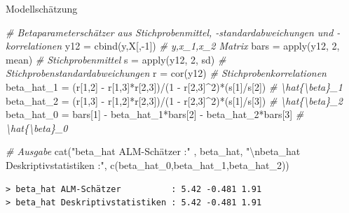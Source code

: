 \documentclass[
  8pt,
  ignorenonframetext,
]{beamer}
\newenvironment{Shaded}{\begin{snugshade}}{\end{snugshade}}
\newcommand{\CommentTok}[1]{\textcolor[rgb]{0.56,0.35,0.01}{\textit{#1}}}
\newcommand{\DecValTok}[1]{\textcolor[rgb]{0.00,0.00,0.81}{#1}}
\newcommand{\FunctionTok}[1]{\textcolor[rgb]{0.00,0.00,0.00}{#1}}
\newcommand{\NormalTok}[1]{#1}
\newcommand{\OtherTok}[1]{\textcolor[rgb]{0.56,0.35,0.01}{#1}}
\newcommand{\SpecialCharTok}[1]{\textcolor[rgb]{0.00,0.00,0.00}{#1}}
\newcommand{\StringTok}[1]{\textcolor[rgb]{0.31,0.60,0.02}{#1}}
\begin{document}
\begin{frame}[fragile]{Modellschätzung}
\begin{Shaded}
\begin{Highlighting}[]
\CommentTok{\# Betaparameterschätzer aus Stichprobenmittel, {-}standardabweichungen und {-}korrelationen}
\NormalTok{y12        }\OtherTok{=} \FunctionTok{cbind}\NormalTok{(y,X[,}\SpecialCharTok{{-}}\DecValTok{1}\NormalTok{])                                     }\CommentTok{\# y,x\_1,x\_2 Matrix}
\NormalTok{bars       }\OtherTok{=} \FunctionTok{apply}\NormalTok{(y12, }\DecValTok{2}\NormalTok{, mean)                                 }\CommentTok{\# Stichprobenmittel}
\NormalTok{s          }\OtherTok{=} \FunctionTok{apply}\NormalTok{(y12, }\DecValTok{2}\NormalTok{, sd)                                   }\CommentTok{\# Stichprobenstandardabweichungen}
\NormalTok{r          }\OtherTok{=} \FunctionTok{cor}\NormalTok{(y12)                                            }\CommentTok{\# Stichprobenkorrelationen}
\NormalTok{beta\_hat\_1 }\OtherTok{=}\NormalTok{ (r[}\DecValTok{1}\NormalTok{,}\DecValTok{2}\NormalTok{] }\SpecialCharTok{{-}}\NormalTok{ r[}\DecValTok{1}\NormalTok{,}\DecValTok{3}\NormalTok{]}\SpecialCharTok{*}\NormalTok{r[}\DecValTok{2}\NormalTok{,}\DecValTok{3}\NormalTok{])}\SpecialCharTok{/}\NormalTok{(}\DecValTok{1} \SpecialCharTok{{-}}\NormalTok{ r[}\DecValTok{2}\NormalTok{,}\DecValTok{3}\NormalTok{]}\SpecialCharTok{\^{}}\DecValTok{2}\NormalTok{)}\SpecialCharTok{*}\NormalTok{(s[}\DecValTok{1}\NormalTok{]}\SpecialCharTok{/}\NormalTok{s[}\DecValTok{2}\NormalTok{]) }\CommentTok{\# \textbackslash{}hat\{\textbackslash{}beta\}\_1}
\NormalTok{beta\_hat\_2 }\OtherTok{=}\NormalTok{ (r[}\DecValTok{1}\NormalTok{,}\DecValTok{3}\NormalTok{] }\SpecialCharTok{{-}}\NormalTok{ r[}\DecValTok{1}\NormalTok{,}\DecValTok{2}\NormalTok{]}\SpecialCharTok{*}\NormalTok{r[}\DecValTok{2}\NormalTok{,}\DecValTok{3}\NormalTok{])}\SpecialCharTok{/}\NormalTok{(}\DecValTok{1} \SpecialCharTok{{-}}\NormalTok{ r[}\DecValTok{2}\NormalTok{,}\DecValTok{3}\NormalTok{]}\SpecialCharTok{\^{}}\DecValTok{2}\NormalTok{)}\SpecialCharTok{*}\NormalTok{(s[}\DecValTok{1}\NormalTok{]}\SpecialCharTok{/}\NormalTok{s[}\DecValTok{3}\NormalTok{]) }\CommentTok{\# \textbackslash{}hat\{\textbackslash{}beta\}\_2}
\NormalTok{beta\_hat\_0 }\OtherTok{=}\NormalTok{ bars[}\DecValTok{1}\NormalTok{] }\SpecialCharTok{{-}}\NormalTok{ beta\_hat\_1}\SpecialCharTok{*}\NormalTok{bars[}\DecValTok{2}\NormalTok{] }\SpecialCharTok{{-}}\NormalTok{ beta\_hat\_2}\SpecialCharTok{*}\NormalTok{bars[}\DecValTok{3}\NormalTok{]   }\CommentTok{\# \textbackslash{}hat\{\textbackslash{}beta\}\_0}

\CommentTok{\# Ausgabe}
\FunctionTok{cat}\NormalTok{(}\StringTok{"beta\_hat ALM{-}Schätzer          :"}\NormalTok{  , beta\_hat,}
    \StringTok{"}\SpecialCharTok{\textbackslash{}n}\StringTok{beta\_hat Deskriptivstatistiken :"}\NormalTok{, }\FunctionTok{c}\NormalTok{(beta\_hat\_0,beta\_hat\_1,beta\_hat\_2))}
\end{Highlighting}
\end{Shaded}

\begin{verbatim}
> beta_hat ALM-Schätzer          : 5.42 -0.481 1.91 
> beta_hat Deskriptivstatistiken : 5.42 -0.481 1.91
\end{verbatim}
\end{frame}
\end{document}
